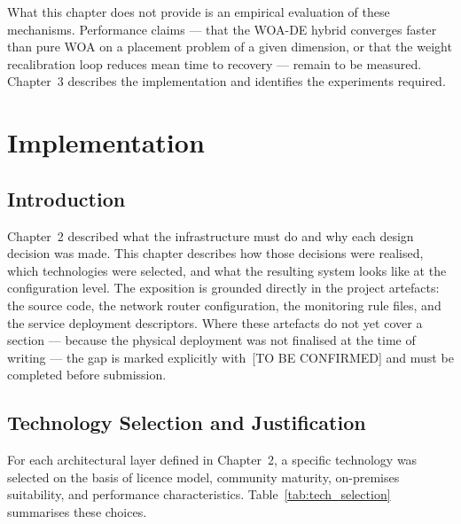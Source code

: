 \documentclass[12pt,a4paper]{report}
\begin{document}
What this chapter does not provide is an empirical evaluation of these mechanisms.
Performance claims --- that the WOA-DE hybrid converges faster than pure WOA on
a placement problem of a given dimension, or that the weight recalibration loop
reduces mean time to recovery --- remain to be measured. Chapter~3 describes the
implementation and identifies the experiments required.


\chapter{Implementation}

\section{Introduction}

Chapter~2 described what the infrastructure must do and why each design decision was
made. This chapter describes how those decisions were realised, which technologies
were selected, and what the resulting system looks like at the configuration level.
The exposition is grounded directly in the project artefacts: the source code, the
network router configuration, the monitoring rule files, and the service deployment
descriptors. Where these artefacts do not yet cover a section --- because the physical
deployment was not finalised at the time of writing --- the gap is marked explicitly
with~[TO BE CONFIRMED] and must be completed before submission.

\section{Technology Selection and Justification}

For each architectural layer defined in Chapter~2, a specific technology was selected
on the basis of licence model, community maturity, on-premises suitability, and
performance characteristics. Table~\ref{tab:tech_selection} summarises these choices.
\end{document}

